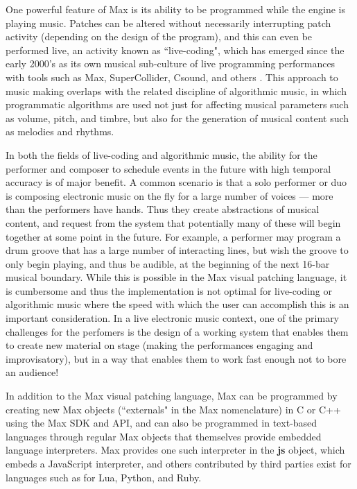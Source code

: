 \documentclass[acmsmall, anonymous, review]{acmart}
\begin{document}
One powerful feature of Max is its ability to be programmed
while the engine is playing music. Patches can be altered 
without necessarily interrupting patch activity (depending on the design
of the program), and this can
even be performed live, an activity known as ``live-coding", which has
emerged since the early 2000's as its own musical sub-culture of 
live programming performances
with tools such as Max, SuperCollider, Csound, and others \cite{Roberts18}.
This approach to music making overlaps with the related discipline of 
algorithmic music, in which programmatic algorithms are used
not just for affecting musical parameters such as volume, pitch, and timbre, 
but also for the generation of musical content such as melodies
and rhythms.

In both the fields of live-coding and algorithmic music, the ability for
the performer and composer to schedule events in the future with high temporal
accuracy is of major benefit. A common scenario is that a solo performer or duo
is composing electronic music on the fly for a large number of voices --- more than
the performers have hands. Thus they create abstractions of musical content,
and request from the system that potentially many of these will begin together
at some point in the future. For example, a performer may program a drum
groove that has a large number of interacting lines, but wish the groove
to only begin playing, and thus be audible, at the beginning of the next 16-bar 
musical boundary. While this is possible in the Max visual
patching language, it is cumbersome and thus the implementation is not
optimal for live-coding or algorithmic music where the speed with which
the user can accomplish this is an important consideration. In a live
electronic music context, one of the primary challenges for the perfomers
is the design of a working system that enables them to create new material on
stage (making the performances engaging and improvisatory), 
but in a way that enables them to work fast enough not to bore an audience!

In addition to the Max visual patching language, Max can be programmed
by creating new Max objects (``externals" in the Max nomenclature) in C or C++ 
using the Max SDK and API, and can also be programmed in text-based 
languages through regular Max objects that themselves provide embedded language
interpreters. Max provides one such interpreter in the \textbf{js} object, 
which embeds a JavaScript interpreter, and others contributed by third parties
exist for languages such as for Lua, Python, and Ruby. 
\end{document}
